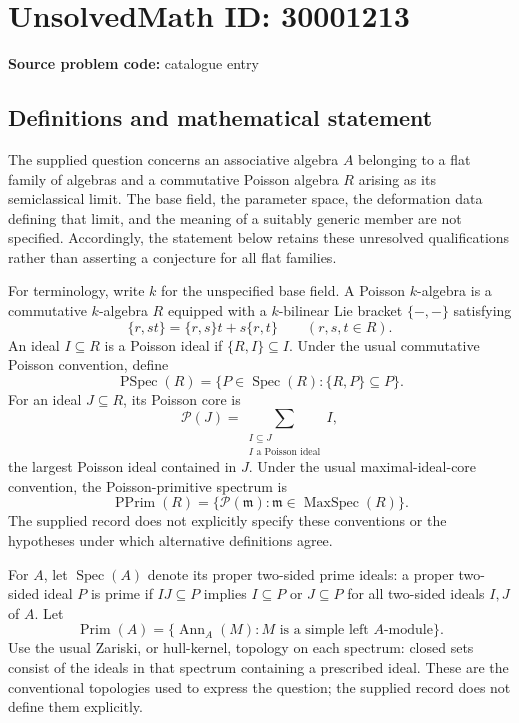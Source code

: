 \documentclass[11pt]{article}
\begin{document}
\section*{UnsolvedMath ID: 30001213}
\textbf{Source problem code:} catalogue entry
\subsection{Definitions and mathematical statement}
The supplied question concerns an associative algebra \(A\) belonging to a flat family of algebras and a commutative Poisson algebra \(R\) arising as its semiclassical limit. The base field, the parameter space, the deformation data defining that limit, and the meaning of a suitably generic member are not specified. Accordingly, the statement below retains these unresolved qualifications rather than asserting a conjecture for all flat families.

For terminology, write \(k\) for the unspecified base field. A Poisson \(k\)-algebra is a commutative \(k\)-algebra \(R\) equipped with a \(k\)-bilinear Lie bracket \(\{-,-\}\) satisfying
\[
\{r,st\}=\{r,s\}t+s\{r,t\}\qquad(r,s,t\in R).
\]
An ideal \(I\subseteq R\) is a Poisson ideal if \(\{R,I\}\subseteq I\). Under the usual commutative Poisson convention, define
\[
\operatorname{PSpec}(R)=\{P\in\operatorname{Spec}(R):\{R,P\}\subseteq P\}.
\]
For an ideal \(J\subseteq R\), its Poisson core is
\[
\mathcal P(J)=\sum_{\substack{I\subseteq J\\I\text{ a Poisson ideal}}} I,
\]
the largest Poisson ideal contained in \(J\). Under the usual maximal-ideal-core convention, the Poisson-primitive spectrum is
\[
\operatorname{PPrim}(R)=\{\mathcal P(\mathfrak m):\mathfrak m\in\operatorname{MaxSpec}(R)\}.
\]
The supplied record does not explicitly specify these conventions or the hypotheses under which alternative definitions agree.

For \(A\), let \(\operatorname{Spec}(A)\) denote its proper two-sided prime ideals: a proper two-sided ideal \(P\) is prime if \(IJ\subseteq P\) implies \(I\subseteq P\) or \(J\subseteq P\) for all two-sided ideals \(I,J\) of \(A\). Let
\[
\operatorname{Prim}(A)=\{\operatorname{Ann}_A(M):M\text{ is a simple left }A\text{-module}\}.
\]
Use the usual Zariski, or hull-kernel, topology on each spectrum: closed sets consist of the ideals in that spectrum containing a prescribed ideal. These are the conventional topologies used to express the question; the supplied record does not define them explicitly.
\end{document}

